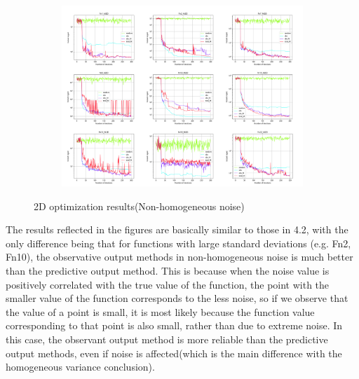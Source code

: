 \documentclass{article}
\begin{document}
\begin{figure}[H]
    \centering
    \begin{subfigure}[t]{1\linewidth}
        \centering
        \includegraphics[width=.96\textwidth]{pictures/Non-homo_noise_2D/Non-homo2D_M.png}
    \end{subfigure}
    \caption{2D optimization results(Non-homogeneous noise)}
    \label{Fig10}
\end{figure}

\hspace{2em}The results reflected in the figures are basically similar to those in 4.2, with the only difference being that for functions with large standard deviations (e.g. Fn2, Fn10), the observative output methods in non-homogeneous noise is much better than the predictive output method. This is because when the noise value is positively correlated with the true value of the function, the point with the smaller value of the function corresponds to the less noise, so if we observe that the value of a point is small, it is most likely because the function value corresponding to that point is also small, rather than due to extreme noise. In this case, the observant output method is more reliable than the predictive output methods, even if noise is affected(which is the main difference with the homogeneous variance conclusion).
\end{document}
